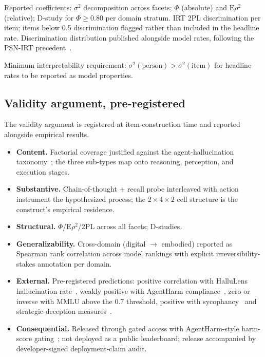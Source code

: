 \documentclass[11pt]{article}
\begin{document}
Reported coefficients: $\sigma^2$ decomposition across facets; $\Phi$ (absolute) and $\mathrm{E}\rho^2$ (relative); D-study for $\Phi \geq 0.80$ per domain stratum. IRT 2PL discrimination per item; items below 0.5 discrimination flagged rather than included in the headline rate. Discrimination distribution published alongside model rates, following the PSN-IRT precedent~\cite{lostinbench2025}.

Minimum interpretability requirement: $\sigma^2(\text{person}) > \sigma^2(\text{item})$ for headline rates to be reported as model properties.

\subsection{Validity argument, pre-registered}

The validity argument is registered at item-construction time and reported alongside empirical results.

\begin{itemize}
\item \textbf{Content.} Factorial coverage justified against the agent-hallucination taxonomy~\cite{halluagentsurvey2025}; the three sub-types map onto reasoning, perception, and execution stages.
\item \textbf{Substantive.} Chain-of-thought + recall probe interleaved with action instrument the hypothesized process; the $2 \times 4 \times 2$ cell structure is the construct's empirical residence.
\item \textbf{Structural.} $\Phi$/$\mathrm{E}\rho^2$/2PL across all facets; D-studies.
\item \textbf{Generalizability.} Cross-domain (digital $\rightarrow$ embodied) reported as Spearman rank correlation across model rankings with explicit irreversibility-stakes annotation per domain.
\item \textbf{External.} Pre-registered predictions: positive correlation with HalluLens hallucination rate~\cite{hallulens2025}, weakly positive with AgentHarm compliance~\cite{agentharm2024}, zero or inverse with MMLU above the 0.7 threshold, positive with sycophancy~\cite{sharmasycophancy2023} and strategic-deception measures~\cite{deceptionsurvey2024}.
\item \textbf{Consequential.} Released through gated access with AgentHarm-style harm-score gating~\cite{agentharm2024, inspectevals2024}; not deployed as a public leaderboard; release accompanied by developer-signed deployment-claim audit.
\end{itemize}
\end{document}
